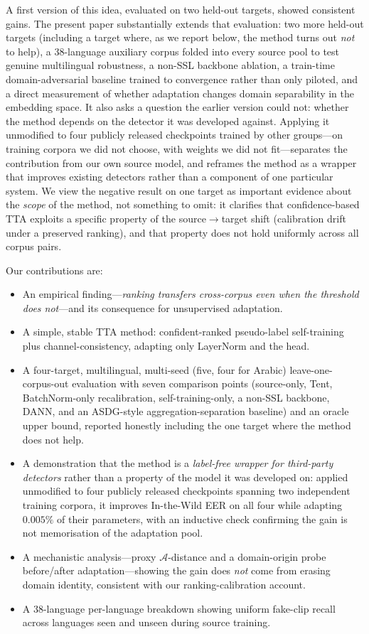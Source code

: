 \documentclass[conference]{IEEEtran}
\begin{document}
A first version of this idea, evaluated on two held-out targets, showed
consistent gains. The present paper substantially extends that evaluation: two
more held-out targets (including a target where, as we report below, the method
turns out \emph{not} to help), a 38-language auxiliary corpus folded into every
source pool to test genuine multilingual robustness, a non-SSL backbone
ablation, a train-time domain-adversarial baseline trained to convergence rather
than only piloted, and a direct measurement of whether adaptation changes
domain separability in the embedding space. It also asks a question the earlier
version could not: whether the method depends on the detector it was developed
against. Applying it unmodified to four publicly released checkpoints trained by
other groups---on training corpora we did not choose, with weights we did not
fit---separates the contribution from our own source model, and reframes the
method as a wrapper that improves existing detectors rather than a component of
one particular system. We view the negative result on one
target as important evidence about the \emph{scope} of the method, not
something to omit: it clarifies that confidence-based TTA exploits a specific
property of the source$\to$target shift (calibration drift under a preserved
ranking), and that property does not hold uniformly across all corpus pairs.

Our contributions are:
\begin{itemize}
\item An empirical finding---\emph{ranking transfers cross-corpus even when the
threshold does not}---and its consequence for unsupervised adaptation.
\item A simple, stable TTA method: confident-ranked pseudo-label self-training
plus channel-consistency, adapting only LayerNorm and the head.
\item A four-target, multilingual, multi-seed (five, four for Arabic)
leave-one-corpus-out evaluation with seven comparison points (source-only,
Tent, BatchNorm-only recalibration, self-training-only, a non-SSL backbone,
DANN, and an ASDG-style aggregation-separation baseline) and an oracle upper
bound, reported honestly including the one target where the method does not
help.
\item A demonstration that the method is a \emph{label-free wrapper for
third-party detectors} rather than a property of the model it was developed on:
applied unmodified to four publicly released checkpoints spanning two
independent training corpora, it improves In-the-Wild EER on all four while
adapting $0.005\%$ of their parameters, with an inductive check confirming the
gain is not memorisation of the adaptation pool.
\item A mechanistic analysis---proxy $\mathcal{A}$-distance and a domain-origin
probe before/after adaptation---showing the gain does \emph{not} come from
erasing domain identity, consistent with our ranking-calibration account.
\item A 38-language per-language breakdown showing uniform fake-clip recall
across languages seen and unseen during source training.
\end{itemize}
\end{document}
